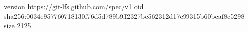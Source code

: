 version https://git-lfs.github.com/spec/v1
oid sha256:0034e957760718130f76d5d789b9ff2327bc562312d17c99315b60bcaf8c5298
size 2125
